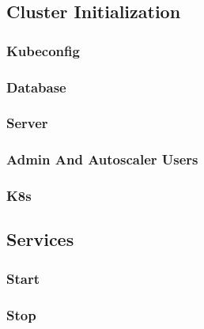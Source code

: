 \subsection{Cluster Initialization}
\label{subsec:implementation_installer_cluster_initialization}

\subsubsection{Kubeconfig}
\label{subsubsec:implementation_installer_cluster_initialization_kubeconfig}

\subsubsection{Database}
\label{subsubsec:implementation_installer_cluster_initialization_database}

\subsubsection{Server}
\label{subsubsec:implementation_installer_cluster_initialization_server}

\subsubsection{Admin And Autoscaler Users}
\label{subsubsec:implementation_installer_cluster_initialization_admin_and_autoscaler_users}

\subsubsection{K8s}
\label{subsubsec:implementation_installer_cluster_initialization_k8s}

\subsection{Services}
\label{subsec:implementation_installer_services}

\subsubsection{Start}
\label{subsubsec:implementation_installer_services_start}

\subsubsection{Stop}
\label{subsubsec:implementation_installer_services_stop}

